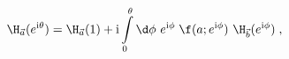 \begin{equation}
\H_{\vec{a}}(e^{{\rm i}\theta})  
= \H_{\vec{a}}(1) 
+ {\rm i} \int\limits_0^\theta \d \phi \ e^{{\rm i}\phi}\;
\f(a;e^{{\rm i}\phi}) 
\ \H_{\vec{b}}(e^{{\rm i}\phi})  \; ,
\end{equation}

